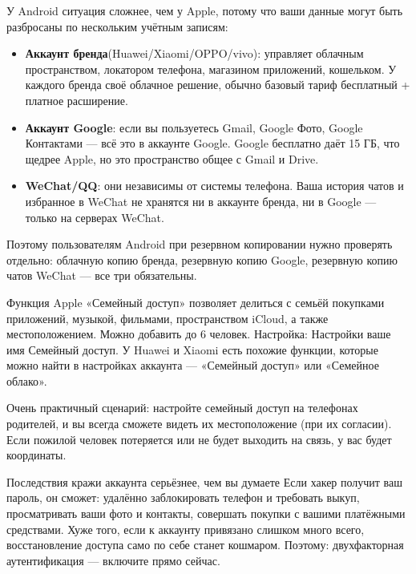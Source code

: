 
У Android ситуация сложнее, чем у Apple, потому что ваши данные могут быть разбросаны по нескольким учётным записям:

\begin{itemize}
  \item \textbf{Аккаунт бренда}(Huawei/Xiaomi/OPPO/vivo): управляет облачным пространством, локатором телефона, магазином приложений, кошельком. У каждого бренда своё облачное решение, обычно базовый тариф бесплатный + платное расширение.
  \item \textbf{Аккаунт Google}: если вы пользуетесь Gmail, Google Фото, Google Контактами — всё это в аккаунте Google. Google бесплатно даёт 15 ГБ, что щедрее Apple, но это пространство общее с Gmail и Drive.
  \item \textbf{WeChat/QQ}: они независимы от системы телефона. Ваша история чатов и избранное в WeChat не хранятся ни в аккаунте бренда, ни в Google — только на серверах WeChat.
\end{itemize}

Поэтому пользователям Android при резервном копировании нужно проверять отдельно: облачную копию бренда, резервную копию Google, резервную копию чатов WeChat — все три обязательны.


Функция Apple «Семейный доступ» позволяет делиться с семьёй покупками приложений, музыкой, фильмами, пространством iCloud, а также местоположением. Можно добавить до 6 человек. Настройка: Настройки ваше имя Семейный доступ. У Huawei и Xiaomi есть похожие функции, которые можно найти в настройках аккаунта — «Семейный доступ» или «Семейное облако».

Очень практичный сценарий: настройте семейный доступ на телефонах родителей, и вы всегда сможете видеть их местоположение (при их согласии). Если пожилой человек потеряется или не будет выходить на связь, у вас будет координаты.

\begin{tcbwarn}{Последствия кражи аккаунта серьёзнее, чем вы думаете}
Если хакер получит ваш пароль, он сможет: удалённо заблокировать телефон и требовать выкуп, просматривать ваши фото и контакты, совершать покупки с вашими платёжными средствами. Хуже того, если к аккаунту привязано слишком много всего, восстановление доступа само по себе станет кошмаром. Поэтому: двухфакторная аутентификация — включите прямо сейчас.

\end{tcbwarn}

